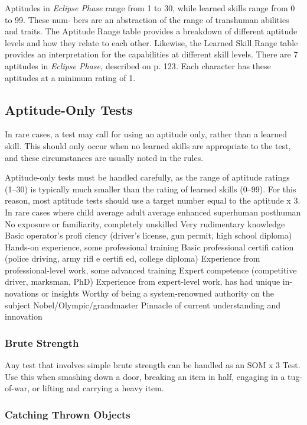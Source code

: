 Aptitudes in \textit{Eclipse Phase} range from 1 to 30, 
while learned skills range from 0 to 99. These num-
bers are an abstraction of the range of transhuman 
abilities and traits. The Aptitude Range table provides 
a breakdown of different aptitude levels and how they 
relate to each other. Likewise, the Learned Skill Range 
table provides an interpretation for the capabilities at 
different skill levels.
There are 7 aptitudes in \textit{Eclipse Phase, }described on p. 
123\textit{.} Each character has these aptitudes at a minimum 
rating of 1.

\subsection{Aptitude-Only Tests}

In rare cases, a test may call for using an aptitude 
only, rather than a learned skill. This should only 
occur when no learned skills are appropriate to the 
test, and these circumstances are usually noted in 
the rules.

Aptitude-only tests must be handled carefully, as 
the range of aptitude ratings (1–30) is typically much 
smaller than the rating of learned skills (0–99). For 
this reason, most aptitude tests should use a target 
number equal to the aptitude x 3. In rare cases where 
child average
adult average
enhanced
superhuman
posthuman
No exposure or familiarity, completely unskilled
Very rudimentary knowledge
Basic operator's proﬁ ciency (driver's license, gun permit, 
high school diploma)
Hands-on experience, some professional training
Basic professional certiﬁ cation (police driving, army riﬂ e 
certiﬁ ed, college diploma)
Experience from professional-level work, some 
advanced training
Expert competence (competitive driver, marksman, PhD)
Experience from expert-level work, has had unique in-
novations or insights
Worthy of being a system-renowned authority on 
the subject
Nobel/Olympic/grandmaster
Pinnacle of current understanding and innovation

\subsubsection{Brute Strength}

Any test that involves simple brute strength can be 
handled as an SOM x 3 Test. Use this when smashing 
down a door, breaking an item in half, engaging in a 
tug-of-war, or lifting and carrying a heavy item.

\subsubsection{Catching Thrown Objects}

